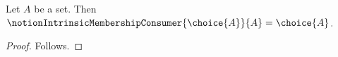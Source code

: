 

\begin{proposition}\label{notion_intrinsic_choice_result_missing}
    Let $A$ be a set.
    Then $\notionIntrinsicMembershipConsumer{\choice{A}}{A}=\choice{A}$.
\end{proposition}
\begin{proof}
    Follows.
\end{proof}
